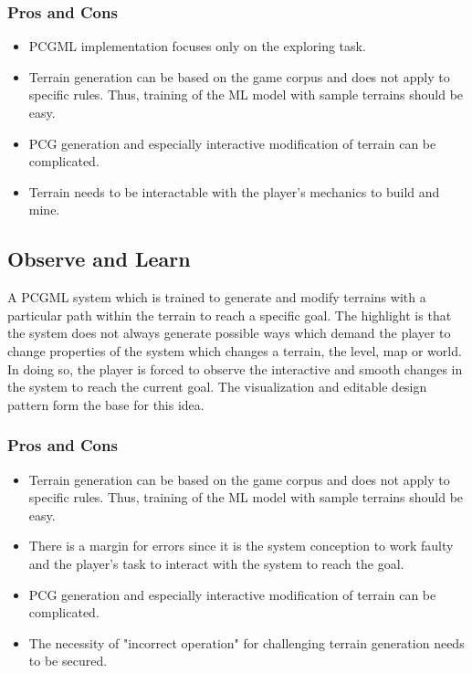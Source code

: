 \documentclass[MGS,Master,english]{twbook}%
\begin{document}
\subsubsection{Pros and Cons}
\begin{itemize}
	\item PCGML implementation focuses only on the exploring task.
	\item Terrain generation can be based on the game corpus and does not apply to specific rules. Thus, training of the ML model with sample terrains should be easy.
	\item PCG generation and especially interactive modification of terrain can be complicated.
	\item Terrain needs to be interactable with the player's mechanics to build and mine.
\end{itemize}


\subsection{Observe and Learn} \label{idea::observeAndLearn}
A PCGML system which is trained to generate and modify terrains with a particular path within the terrain to reach a specific goal. The highlight is that the system does not always generate possible ways which demand the player to change properties of the system which changes a terrain, the level, map or world. In doing so, the player is forced to observe the interactive and smooth changes in the system to reach the current goal. The visualization and editable design pattern form the base for this idea.

\subsubsection{Pros and Cons}
\begin{itemize}
	\item Terrain generation can be based on the game corpus and does not apply to specific rules. Thus, training of the ML model with sample terrains should be easy.
	\item There is a margin for errors since it is the system conception to work faulty and the player's task to interact with the system to reach the goal. 
	\item PCG generation and especially interactive modification of terrain can be complicated.
	\item The necessity of "incorrect operation" for challenging terrain generation needs to be secured.
\end{itemize}
\end{document}

